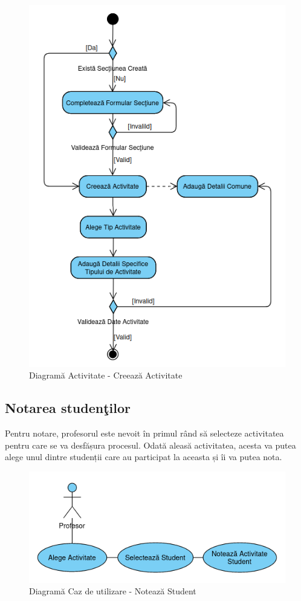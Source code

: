 \documentclass[12pt, a4paper, oneside, romanian]{teza-upb}
\begin{document}
\begin{figure}[H]
\centering
\includegraphics*[width=0.65\columnwidth]{diagrama-activitate-creeaza-activitate}
\caption{Diagramă Activitate - Creează Activitate}
\label{diagrama-activitate-creeaza-activitate}
\end{figure}

\subsection{Notarea studenţilor}

Pentru notare, profesorul este nevoit în primul rând să selecteze activitatea pentru care se va desfășura procesul. Odată aleasă activitatea, acesta va putea alege unul dintre studenții care au participat la aceasta și îi va putea nota.

\begin{figure}[H]
\centering
\includegraphics*[width=0.65\columnwidth]{diagrama-use-case-noteaza-student}
\caption{Diagramă Caz de utilizare - Notează Student}
\label{diagrama-use-case-noteaza-student}
\end{figure}
\end{document}
